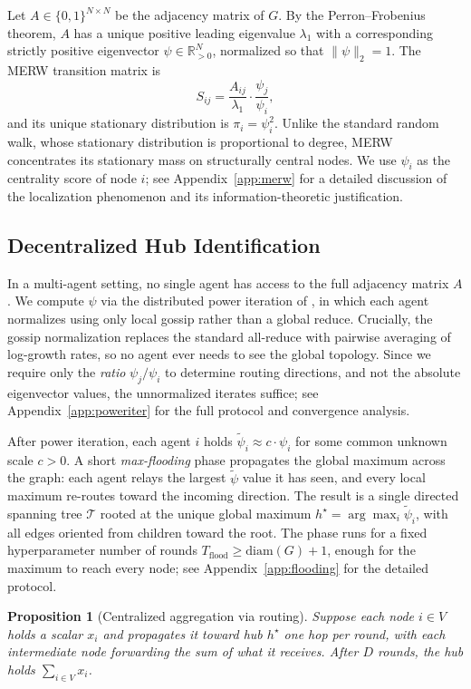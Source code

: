 \documentclass{article}
\newtheorem{proposition}{Proposition}
\begin{document}
Let $A \in \{0,1\}^{N \times N}$ be the adjacency matrix of $G$. By the Perron--Frobenius theorem, $A$ has a unique positive leading eigenvalue $\lambda_1$ with a corresponding strictly positive eigenvector $\psi \in \mathbb{R}^N_{>0}$, normalized so that $\|\psi\|_2 = 1$. The MERW transition matrix is
\[
S_{ij} = \frac{A_{ij}}{\lambda_1} \cdot \frac{\psi_j}{\psi_i},
\]
and its unique stationary distribution is $\pi_i = \psi_i^2$. Unlike the standard random walk, whose stationary distribution is proportional to degree, MERW concentrates its stationary mass on structurally central nodes. We use $\psi_i$ as the centrality score of node $i$; see Appendix~\ref{app:merw} for a detailed discussion of the localization phenomenon and its information-theoretic justification.

\subsection{Decentralized Hub Identification}

In a multi-agent setting, no single agent has access to the full adjacency matrix $A$. We compute $\psi$ via the distributed power iteration of \citep{jelasity2007asynchronous}, in which each agent normalizes using only local gossip rather than a global reduce. Crucially, the gossip normalization replaces the standard all-reduce with pairwise averaging of log-growth rates, so no agent ever needs to see the global topology. Since we require only the \emph{ratio} $\psi_j / \psi_i$ to determine routing directions, and not the absolute eigenvector values, the unnormalized iterates suffice; see Appendix~\ref{app:poweriter} for the full protocol and convergence analysis.

After power iteration, each agent $i$ holds $\tilde{\psi}_i \approx c \cdot \psi_i$ for some common unknown scale $c > 0$. A short \emph{max-flooding} phase propagates the global maximum across the graph: each agent relays the largest $\tilde{\psi}$ value it has seen, and every local maximum re-routes toward the incoming direction. The result is a single directed spanning tree $\mathcal{T}$ rooted at the unique global maximum $h^\star = \arg\max_i \tilde{\psi}_i$, with all edges oriented from children toward the root. The phase runs for a fixed hyperparameter number of rounds $T_{\mathrm{flood}} \geq \mathrm{diam}(G)+1$, enough for the maximum to reach every node; see Appendix~\ref{app:flooding} for the detailed protocol.

\begin{proposition}[Centralized aggregation via routing]
\label{prop:aggregation}
Suppose each node $i \in V$ holds a scalar $x_i$ and propagates it toward hub $h^\star$ one hop per round, with each intermediate node forwarding the sum of what it receives. After $D$ rounds, the hub holds $\sum_{i \in V} x_i$.
\end{proposition}
\end{document}
